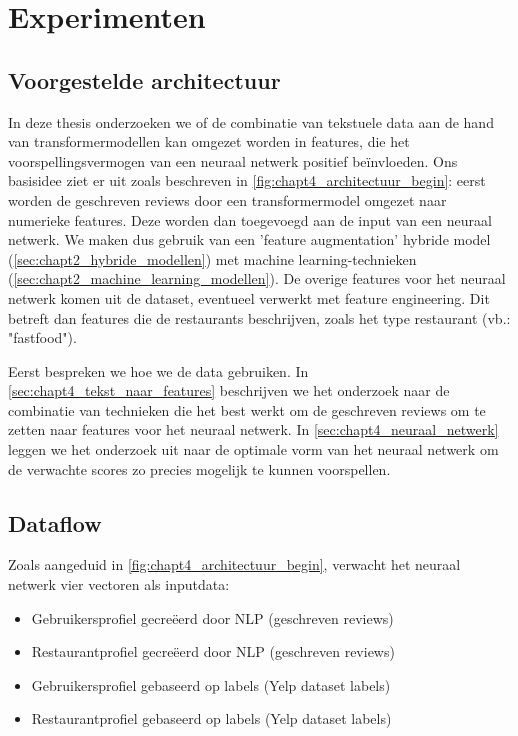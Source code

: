 \chapter{Experimenten}

\section{Voorgestelde architectuur}
In deze thesis onderzoeken we of de combinatie van tekstuele data aan de hand van transformermodellen kan omgezet worden in features, die het voorspellingsvermogen van een neuraal netwerk positief beïnvloeden. Ons basisidee ziet er uit zoals beschreven in \autoref{fig:chapt4_architectuur_begin}: eerst worden de geschreven reviews door een transformermodel omgezet naar numerieke features. Deze worden dan toegevoegd aan de input van een neuraal netwerk. We maken dus gebruik van een 'feature augmentation'  hybride model (\ref{sec:chapt2_hybride_modellen}) met machine learning-technieken (\ref{sec:chapt2_machine_learning_modellen}). De overige features voor het neuraal netwerk komen uit de dataset, eventueel verwerkt met feature engineering. Dit betreft dan features die de restaurants beschrijven, zoals het type restaurant (vb.: "fastfood").


Eerst bespreken we hoe we de data gebruiken. In \autoref{sec:chapt4_tekst_naar_features} beschrijven we het onderzoek naar de combinatie van technieken die het best werkt om de geschreven reviews om te zetten naar features voor het neuraal netwerk. In \autoref{sec:chapt4_neuraal_netwerk} leggen we het onderzoek uit naar de optimale vorm van het neuraal netwerk om de verwachte scores zo precies mogelijk te kunnen voorspellen.

\section{Dataflow}
\label{sec:chapt4_data_flow}
Zoals aangeduid in \autoref{fig:chapt4_architectuur_begin}, verwacht het neuraal netwerk vier vectoren als inputdata:
\begin{itemize}
    \item Gebruikersprofiel gecreëerd door NLP (geschreven reviews)
    \item Restaurantprofiel gecreëerd door NLP (geschreven reviews)
    \item Gebruikersprofiel gebaseerd op labels (Yelp dataset labels)
    \item Restaurantprofiel gebaseerd op labels (Yelp dataset labels)
\end{itemize}

